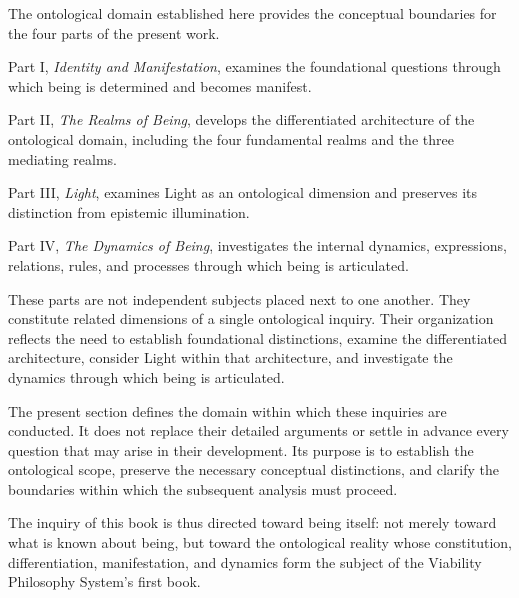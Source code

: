 The ontological domain established here provides
the conceptual boundaries for the four parts of
the present work.

Part I, \textit{Identity and Manifestation},
examines the foundational questions through which
being is determined and becomes manifest.

Part II, \textit{The Realms of Being}, develops
the differentiated architecture of the ontological
domain, including the four fundamental realms
and the three mediating realms.

Part III, \textit{Light}, examines Light as an
ontological dimension and preserves its distinction
from epistemic illumination.

Part IV, \textit{The Dynamics of Being}, investigates
the internal dynamics, expressions, relations,
rules, and processes through which being is
articulated.

These parts are not independent subjects placed
next to one another. They constitute related
dimensions of a single ontological inquiry.
Their organization reflects the need to establish
foundational distinctions, examine the differentiated
architecture, consider Light within that architecture,
and investigate the dynamics through which being
is articulated.

The present section defines the domain within
which these inquiries are conducted. It does not
replace their detailed arguments or settle in
advance every question that may arise in their
development. Its purpose is to establish the
ontological scope, preserve the necessary
conceptual distinctions, and clarify the
boundaries within which the subsequent analysis
must proceed.

The inquiry of this book is thus directed toward
being itself: not merely toward what is known
about being, but toward the ontological reality
whose constitution, differentiation, manifestation,
and dynamics form the subject of the Viability
Philosophy System's first book.

\cleardoublepage

